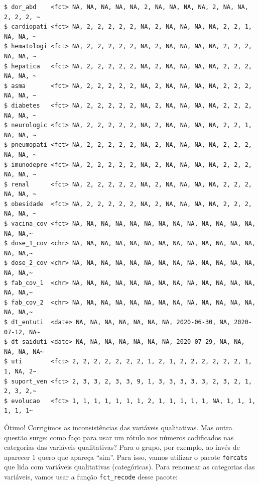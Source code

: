 \documentclass[
  letterpaper,
  DIV=11,
  numbers=noendperiod]{scrreprt}
\begin{document}
\begin{verbatim}
$ dor_abd    <fct> NA, NA, NA, NA, NA, 2, NA, NA, NA, NA, 2, NA, NA, 2, 2, 2, ~
$ cardiopati <fct> NA, 2, 2, 2, 2, 2, NA, 2, NA, NA, NA, NA, 2, 2, 1, NA, NA, ~
$ hematologi <fct> NA, 2, 2, 2, 2, 2, NA, 2, NA, NA, NA, NA, 2, 2, 2, NA, NA, ~
$ hepatica   <fct> NA, 2, 2, 2, 2, 2, NA, 2, NA, NA, NA, NA, 2, 2, 2, NA, NA, ~
$ asma       <fct> NA, 2, 2, 2, 2, 2, NA, 2, NA, NA, NA, NA, 2, 2, 2, NA, NA, ~
$ diabetes   <fct> NA, 2, 2, 2, 2, 2, NA, 2, NA, NA, NA, NA, 2, 2, 2, NA, NA, ~
$ neurologic <fct> NA, 2, 2, 2, 2, 2, NA, 2, NA, NA, NA, NA, 2, 2, 1, NA, NA, ~
$ pneumopati <fct> NA, 2, 2, 2, 2, 2, NA, 2, NA, NA, NA, NA, 2, 2, 2, NA, NA, ~
$ imunodepre <fct> NA, 2, 2, 2, 2, 2, NA, 2, NA, NA, NA, NA, 2, 2, 2, NA, NA, ~
$ renal      <fct> NA, 2, 2, 2, 2, 2, NA, 2, NA, NA, NA, NA, 2, 2, 2, NA, NA, ~
$ obesidade  <fct> NA, 2, 2, 2, 2, 2, NA, 2, NA, NA, NA, NA, 2, 2, 2, NA, NA, ~
$ vacina_cov <fct> NA, NA, NA, NA, NA, NA, NA, NA, NA, NA, NA, NA, NA, NA, NA,~
$ dose_1_cov <chr> NA, NA, NA, NA, NA, NA, NA, NA, NA, NA, NA, NA, NA, NA, NA,~
$ dose_2_cov <chr> NA, NA, NA, NA, NA, NA, NA, NA, NA, NA, NA, NA, NA, NA, NA,~
$ fab_cov_1  <chr> NA, NA, NA, NA, NA, NA, NA, NA, NA, NA, NA, NA, NA, NA, NA,~
$ fab_cov_2  <chr> NA, NA, NA, NA, NA, NA, NA, NA, NA, NA, NA, NA, NA, NA, NA,~
$ dt_entuti  <date> NA, NA, NA, NA, NA, NA, NA, 2020-06-30, NA, 2020-07-12, NA~
$ dt_saiduti <date> NA, NA, NA, NA, NA, NA, NA, 2020-07-29, NA, NA, NA, NA, NA~
$ uti        <fct> 2, 2, 2, 2, 2, 2, 2, 1, 2, 1, 2, 2, 2, 2, 2, 2, 1, 1, NA, 2~
$ suport_ven <fct> 2, 3, 3, 2, 3, 3, 9, 1, 3, 3, 3, 3, 3, 2, 3, 2, 1, 2, 3, 2,~
$ evolucao   <fct> 1, 1, 1, 1, 1, 1, 1, 2, 1, 1, 1, 1, 1, NA, 1, 1, 1, 1, 1, 1~
\end{verbatim}

Ótimo! Corrigimos as inconsistências das variáveis qualitativas. Mas
outra questão surge: como faço para usar um rótulo nos números
codificados nas categorias das variáveis qualitativas? Para o grupo, por
exemplo, ao invés de aparecer 1 quero que apareça ``sim''. Para isso,
vamos utilizar o pacote \texttt{forcats} que lida com variáveis
qualitativas (categóricas). Para renomear as categorias das variáveis,
vamos usar a função \texttt{fct\_recode} desse pacote:
\end{document}
